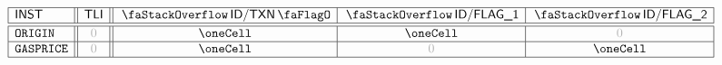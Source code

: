 \[
	\begin{array}{|l||c||c|c|c|}
		\hline
		\INST           & \tli  & \stackDecTxnFlag & \decFlag{1} & \decFlag{2} \\ \hline\hline
		\inst{ORIGIN}   & \zero & \oneCell         & \oneCell    & \zero       \\ \hline
		\inst{GASPRICE} & \zero & \oneCell         & \zero       & \oneCell    \\ \hline
	\end{array}
\]

